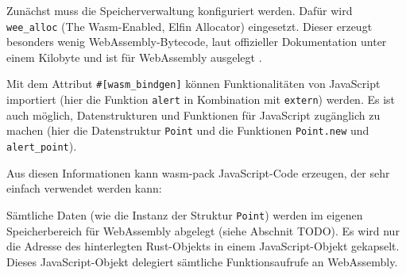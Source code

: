 

Zunächst muss die Speicherverwaltung konfiguriert werden. Dafür wird \lstinline{wee_alloc} (The Wasm-Enabled, Elfin Allocator) eingesetzt. Dieser erzeugt besonders wenig WebAs\-sembly-Bytecode, laut offizieller Dokumentation unter einem Kilobyte und ist für WebAssembly ausgelegt \cite{WeeAlloc}.

Mit dem Attribut \lstinline{#[wasm_bindgen]} können Funktionalitäten von JavaScript importiert (hier die Funktion \lstinline{alert} in Kombination mit \lstinline{extern}) werden. Es ist auch möglich, Datenstrukturen und Funktionen für JavaScript zugänglich zu machen (hier die Datenstruktur \lstinline{Point} und die Funktionen \lstinline{Point.new} und \lstinline{alert_point}).

Aus diesen Informationen kann wasm-pack JavaScript-Code erzeugen, der sehr einfach verwendet werden kann:



Sämtliche Daten (wie die Instanz der Struktur \lstinline{Point}) werden im eigenen Speicherbereich für WebAssembly abgelegt (siehe Abschnit TODO). Es wird nur die Adresse des hinterlegten Rust-Objekts in einem JavaScript-Objekt gekapselt. Dieses JavaScript-Objekt delegiert sämtliche Funktionsaufrufe an WebAssembly.

